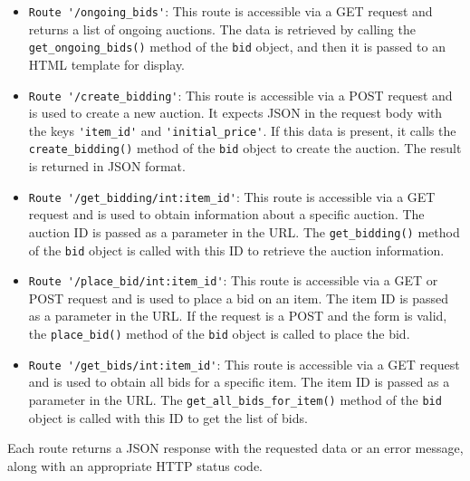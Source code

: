 \documentclass[12pt]{article}
\begin{document}
\begin{itemize}
    \item \verb|Route '/ongoing_bids'|: This route is accessible via a GET request and returns a list of ongoing auctions. The data is retrieved by calling the \verb|get_ongoing_bids()| method of the \verb|bid| object, and then it is passed to an HTML template for display.
    
    \item \verb|Route '/create_bidding'|: This route is accessible via a POST request and is used to create a new auction. It expects JSON in the request body with the keys \verb|'item_id'| and \verb|'initial_price'|. If this data is present, it calls the \verb|create_bidding()| method of the \verb|bid| object to create the auction. The result is returned in JSON format.
    
    \item \verb|Route '/get_bidding/int:item_id'|: This route is accessible via a GET request and is used to obtain information about a specific auction. The auction ID is passed as a parameter in the URL. The \verb|get_bidding()| method of the \verb|bid| object is called with this ID to retrieve the auction information.
    
    \item \verb|Route '/place_bid/int:item_id'|: This route is accessible via a GET or POST request and is used to place a bid on an item. The item ID is passed as a parameter in the URL. If the request is a POST and the form is valid, the \verb|place_bid()| method of the \verb|bid| object is called to place the bid.
    
    \item \verb|Route '/get_bids/int:item_id'|: This route is accessible via a GET request and is used to obtain all bids for a specific item. The item ID is passed as a parameter in the URL. The \verb|get_all_bids_for_item()| method of the \verb|bid| object is called with this ID to get the list of bids.
\end{itemize}
Each route returns a JSON response with the requested data or an error message, along with an appropriate HTTP status code.

%
% 
\end{document}
